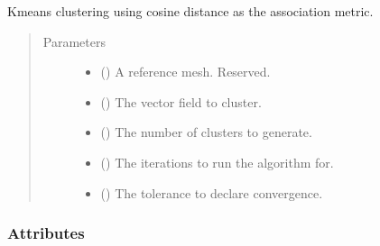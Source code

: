 \documentclass[letterpaper,10pt,english]{sphinxmanual}
\begin{document}
\begin{fulllineitems}
\label{\detokenize{api/generated/directional_clustering.clustering.CosineKMeans:directional_clustering.clustering.CosineKMeans}}
K\sphinxhyphen{}means clustering using cosine distance as the association metric.
\begin{quote}\begin{description}
\item[{Parameters}] \leavevmode\begin{itemize}
\item {} 
 () \textendash{} A reference mesh. Reserved.

\item {} 
 () \textendash{} The vector field to cluster.

\item {} 
 () \textendash{} The number of clusters to generate.

\item {} 
 () \textendash{} The iterations to run the algorithm for.

\item {} 
 () \textendash{} The tolerance to declare convergence.

\end{itemize}

\end{description}\end{quote}
\subsubsection*{Attributes}


\begin{savenotes}\sphinxatlongtablestart\begin{longtable}[c]{}
\hline

\endfirsthead

%
{}\\
\hline


\end{longtable}
\end{savenotes}
\end{fulllineitems}
\end{document}

